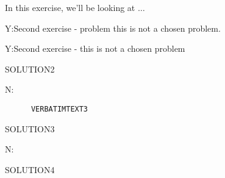 \begin{intro}
	In this exercise, we'll be looking at \( \dots \)
\end{intro}
\begin{problem}
  Y:Second exercise - problem this is not a chosen problem.
\end{problem}
\begin{problem}
  Y:Second exercise - this is not a chosen problem
\end{problem}
\begin{solution}
	SOLUTION2
\end{solution}
\begin{problem}
  N:\lipsum[1]
\begin{verbatim}
      VERBATIMTEXT3
  \end{verbatim}
\end{problem}
\begin{solution}
	SOLUTION3
\end{solution}
\begin{problem}
N:\lipsum[2-3]
\end{problem}
\begin{solution}
	SOLUTION4
\end{solution}
\begin{problem}
\lipsum[4]
\end{problem}
